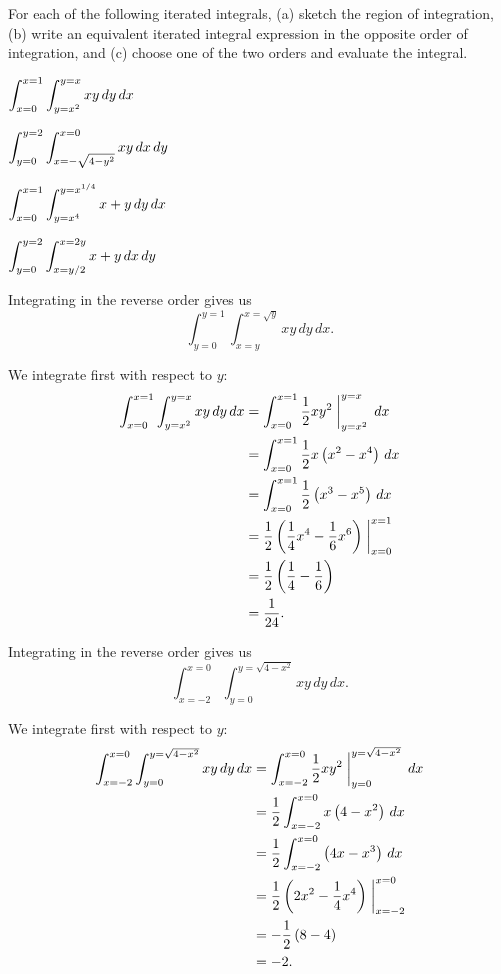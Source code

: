 \begin{exercises} 

\item For each of the following iterated integrals, (a) sketch the region of integration, (b) write an equivalent iterated integral expression in the opposite order of integration, and (c) choose one of the two orders and evaluate the integral.
\ba
	\item $\displaystyle \int_{x=0}^{x=1}  \int_{y=x^2}^{y=x} xy \, dy  \, dx$
	\item $\displaystyle \int_{y=0}^{y=2}  \int_{x=-\sqrt{4-y^2}}^{x=0} xy \, dx  \, dy$
	\item $\displaystyle \int_{x=0}^{x=1}  \int_{y=x^4}^{y=x^{1/4}} x+y \, dy  \, dx$
	\item $\displaystyle \int_{y=0}^{y=2}  \int_{x=y/2}^{x=2y} x+y \, dx  \, dy$
\ea

\begin{exerciseSolution}
\ba
	\item Integrating in the reverse order gives us 
\[\int_{y=0}^{y=1}  \int_{x=y}^{x=\sqrt{y}} xy \, dy  \, dx.\]

We integrate first with respect to $y$:
\begin{align*}
\int_{x=0}^{x=1}  \int_{y=x^2}^{y=x} xy \, dy  \, dx &= \int_{x=0}^{x=1} \frac{1}{2}xy^2 \biggm|_{y=x^2}^{y=x}  \, dx \\
	&= \int_{x=0}^{x=1} \frac{1}{2}x\left(x^2-x^4\right) \, dx \\
	&= \int_{x=0}^{x=1} \frac{1}{2}\left(x^3-x^5\right) \, dx \\
	&= \frac{1}{2} \left(\frac{1}{4}x^4-\frac{1}{6}x^6\right)\biggm|_{x=0}^{x=1} \\
	&= \frac{1}{2} \left(\frac{1}{4}-\frac{1}{6}\right) \\
	&= \frac{1}{24}.
\end{align*}

	\item Integrating in the reverse order gives us 
\[\int_{x=-2}^{x=0}  \int_{y=0}^{y=\sqrt{4-x^2}} xy \, dy  \, dx.\]

We integrate first with respect to $y$:
\begin{align*}
\int_{x=-2}^{x=0}  \int_{y=0}^{y=\sqrt{4-x^2}} xy \, dy  \, dx &= \int_{x=-2}^{x=0} \frac{1}{2}xy^2 \biggm|_{y=0}^{y=\sqrt{4-x^2}}  \, dx \\
	&= \frac{1}{2} \int_{x=-2}^{x=0} x\left(4-x^2\right) \, dx \\
	&= \frac{1}{2}\int_{x=-2}^{x=0} \left(4x-x^3\right) \, dx \\
	&= \frac{1}{2} \left(2x^2-\frac{1}{4}x^4\right)\biggm|_{x=-2}^{x=0} \\
	&= -\frac{1}{2} \left(8-4\right) \\
	&= -2.
\end{align*}


\end{exerciseSolution}
\end{exercises}
